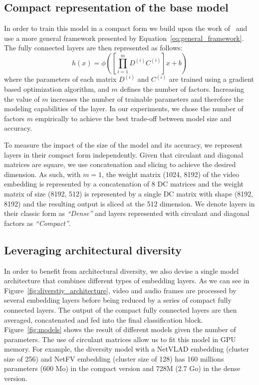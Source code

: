 \documentclass[runningheads]{llncs}
\begin{document}
\subsection{Compact representation of the base model}
\label{subsection:compact}

In order to train this model in a compact form we build upon the work of~\cite{7410684} and use a more general framework presented by  Equation~\ref{eq:general_framework}. The fully connected layers are then represented as follows:
$$h(x) = \phi\left(\left[\prod_{i=1}^{m} D^{(i)} C^{(i)}\right]x + b\right)$$
\noindent
where the parameters of each matrix $D^{(i)}$ and $C^{(i)}$ are trained using a gradient based optimization algorithm, and $m$ defines the number of factors. Increasing the value of $m$ increases the number of trainable parameters and therefore the modeling capabilities of the layer. In our experiments, we chose the number of factors $m$ empirically to achieve the best trade-off between model size and accuracy.

To measure the impact of the size of the model and its accuracy, we represent layers in their compact form independently.
Given that circulant and diagonal matrices are square, we use concatenation and slicing to achieve the desired dimension. As such, with $m=1$, the weight matrix (1024, 8192) of the video embedding is represented by a concatenation of 8 DC matrices and the weight matrix of size (8192, 512) is represented by a single DC matrix with shape (8192, 8192) and the resulting output is sliced at the 512 dimension. We denote layers in their classic form as \textit{``Dense''} and layers represented with circulant and diagonal factors as \textit{``Compact''}.



\subsection{Leveraging architectural diversity}
\label{subsection:ensemble}

In order to benefit from architectural diversity, we also devise a single model architecture that combines different types of embedding layers. As we can see in Figure~\ref{fig:diverstiy_architecture}, video and audio frames are processed by several embedding layers before being reduced by a series of compact fully connected layers. The output of the compact fully connected layers are then averaged, concatenated and fed into the final classification block. Figure~\ref{fig:models} shows the result of different models given the number of parameters. The use of circulant matrices allow us to fit this model in GPU memory. For example, the diversity model with a NetVLAD embedding (cluster size of 256) and NetFV embedding (cluster size of 128) has 160 millions parameters (600 Mo) in the compact version and 728M (2.7 Go) in the dense version.
\end{document}

